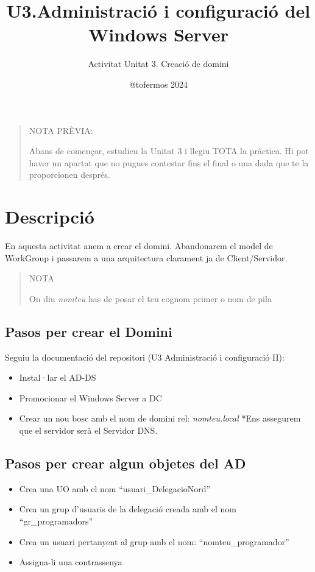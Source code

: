 \documentclass[
  a4paper,
]{article}
\title{U3.Administració i configuració del Windows Server}
\subtitle{Activitat Unitat 3. Creació de domini}
\author{@tofermos 2024}
\date{}
\providecommand{\tightlist}{%
  \setlength{\itemsep}{0pt}\setlength{\parskip}{0pt}}
\begin{document}
\maketitle

{
\setcounter{tocdepth}{2}
\tableofcontents
}
\newpage
\renewcommand\tablename{Tabla}

\begin{quote}
NOTA PRÈVIA:

Abans de començar, estudieu la Unitat 3 i llegiu TOTA la pràctica. Hi
pot haver un apartat que no pugues contestar fins el final o una dada
que te la proporcionen després.
\end{quote}

\section{Descripció}\label{descripciuxf3}

En aquesta activitat anem a crear el domini. Abandonarem el model de
WorkGroup i passarem a una arquitectura clarament ja de Client/Servidor.

\begin{quote}
NOTA

On diu \emph{nomteu} has de posar el teu cognom primer o nom de pila
\end{quote}

\subsection{Pasos per crear el Domini}\label{pasos-per-crear-el-domini}

Seguiu la documentació del repositori (U3 Administració i configuració
II):

\begin{itemize}
\tightlist
\item
  Instal·lar el AD-DS
\item
  Promocionar el Windows Server a DC
\item
  Crear un nou bosc amb el nom de domini rel: \emph{nomteu.local} *Ens
  assegurem que el servidor serà el Servidor DNS.
\end{itemize}

\subsection{Pasos per crear algun objetes del
AD}\label{pasos-per-crear-algun-objetes-del-ad}

\begin{itemize}
\tightlist
\item
  Crea una UO amb el nom ``usuari\_DelegacioNord''
\item
  Crea un grup d'usuaris de la delegació creada amb el nom
  ``gr\_programadors''
\item
  Crea un usuari pertanyent al grup amb el nom: ``nomteu\_programador''
\item
  Assigna-li una contrassenya
\end{itemize}
\end{document}
